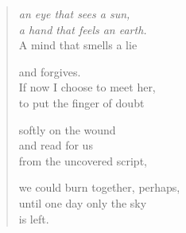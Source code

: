 {\begin{verse}
\emph{an eye that sees a sun,\\
a hand that feels an earth.}\\
A mind that smells a lie

and forgives.\\
If now I choose to meet her,\\
to put the finger of doubt

softly on the wound\\
and read for us\\
from the uncovered script,

we could burn together, perhaps,\\
until one day only the sky\\
is left.

\end{verse}

}
